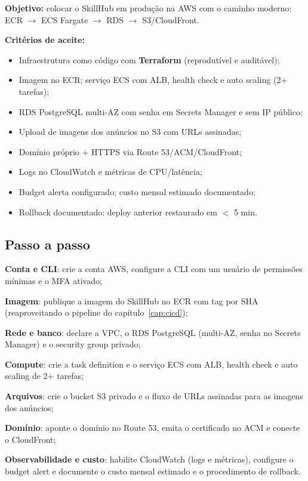 \begin{caixaprojeto}
\textbf{Objetivo:} colocar o SkillHub em produção na AWS com o caminho
moderno: ECR $\rightarrow$ ECS Fargate $\rightarrow$ RDS $\rightarrow$ S3/CloudFront.

\textbf{Critérios de aceite:}
\begin{itemize}[leftmargin=*, itemsep=0.2em]
  \item Infraestrutura como código com \textbf{Terraform} (reprodutível e auditável);
  \item Imagem no ECR; serviço ECS com ALB, health check e auto scaling (2+ tarefas);
  \item RDS PostgreSQL multi-AZ com senha em Secrets Manager e sem IP público;
  \item Upload de imagens dos anúncios no S3 com URLs assinadas;
  \item Domínio próprio + HTTPS via Route 53/ACM/CloudFront;
  \item Logs no CloudWatch e métricas de CPU/latência;
  \item Budget alerta configurado; custo mensal estimado documentado;
  \item Rollback documentado: deploy anterior restaurado em $<$ 5 min.
\end{itemize}
\end{caixaprojeto}

\subsection{Passo a passo}

\begin{passos}
  \item \textbf{Conta e CLI}: crie a conta AWS, configure a CLI com um usuário
  de permissões mínimas e o MFA ativado;
  \item \textbf{Imagem}: publique a imagem do SkillHub no ECR com tag por SHA
  (reaproveitando o pipeline do capítulo~\ref{cap:cicd});
  \item \textbf{Rede e banco}: declare a VPC, o RDS PostgreSQL (multi-AZ,
  senha no Secrets Manager) e o security group privado;
  \item \textbf{Compute}: crie a task definition e o serviço ECS com ALB,
  health check e auto scaling de 2+ tarefas;
  \item \textbf{Arquivos}: crie o bucket S3 privado e o fluxo de URLs assinadas
  para as imagens dos anúncios;
  \item \textbf{Domínio}: aponte o domínio no Route 53, emita o certificado no
  ACM e conecte o CloudFront;
  \item \textbf{Observabilidade e custo}: habilite CloudWatch (logs e
  métricas), configure o budget alert e documente o custo mensal estimado e o
  procedimento de rollback.
\end{passos}

